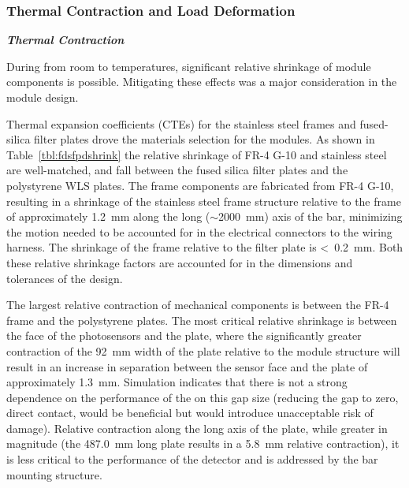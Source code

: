 \subsubsection{Thermal Contraction and Load Deformation}
\label{sssec:pds-thermal-load}
\textit{\bf Thermal Contraction}

During \cooldown from room 
to  temperatures,  significant relative shrinkage of module components is possible.  Mitigating these effects was a major consideration in the  module design.

Thermal expansion coefficients (CTEs) for the stainless steel  frames and fused-silica filter plates drove the materials selection for the  modules.  As shown in Table~\ref{tbl:fdsfpdshrink}  the relative shrinkage of FR-4 G-10 and stainless steel are well-matched, and fall between the fused silica filter plates and the polystyrene WLS plates. The frame components are fabricated from FR-4 G-10, resulting in a shrinkage of the stainless steel frame structure relative to the frame of approximately \SI{1.2}{mm} along the long ($\sim$\SI{2000}{mm}) axis of the bar, minimizing the motion needed to be accounted for in the electrical connectors to the wiring harness.  The shrinkage of the frame relative to the filter plate is <~\SI{0.2}{mm}.  Both these relative shrinkage factors are accounted for in the dimensions and tolerances of the design.

The largest relative contraction of mechanical components is between the FR-4 frame and the polystyrene  plates. The most critical relative shrinkage is between the face of the photosensors and the  plate, where the significantly greater contraction of the \SI{92}{mm} width of the plate relative to the  module structure will result in an increase in separation between the sensor face and the plate of approximately \SI{1.3}{mm}.
 Simulation indicates that there is not a strong dependence on the performance of the  on this gap size (reducing the gap to zero, direct contact, would be beneficial but would introduce unacceptable risk of damage).  Relative contraction along the long axis of the  plate, while greater in magnitude (the \SI{487.0}{mm} long plate results in a \SI{5.8}{mm} relative contraction), it is less critical to the performance of the detector and is addressed by the  bar mounting structure.

